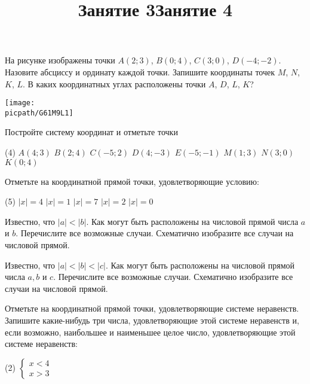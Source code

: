 \begin{class}[number=3-4]
	\title{Занятие 3}
	\begin{listofex}
		\item
		\begin{minipage}[c]{0.6\linewidth}
			На рисунке изображены точки \( A (2;3) \), \( B(0;4) \), \( C(3;0) \), \( D(-4;-2) \). Назовите абсциссу и ординату каждой точки. Запишите координаты точек \( M \), \( N \), \( K \), \( L \). В каких координатных углах расположены точки \( A \), \( D \), \( L \), \( K \)?
		\end{minipage}
		\begin{minipage}[c]{0.4\linewidth}
			\texttt{[image: \\picpath/G61M9L1]}
		\end{minipage}
		\item Постройте систему координат и отметьте точки
		\begin{tasks}(4)
			\task \( A(4;3) \)
			\task \( B(2;4) \)
			\task \( C(-5;2) \)
			\task \( D(4;-3) \)
			\task \( E(-5;-1) \)
			\task \( M(1;3) \)
			\task \( N(3;0) \)
			\task \( K(0;4) \)
		\end{tasks}
		\item Отметьте на координатной прямой точки, удовлетворяющие условию:
		\begin{tasks}(5)
			\task \( |x|=4 \)
			\task \( |x|=1 \)
			\task \( |x|=7 \)
			\task \( |x|=2 \)
			\task \( |x|=0 \)
		\end{tasks}
		\item Известно, что \( |a|<|b| \). Как могут быть расположены на числовой прямой числа \( a \) и \( b \). Перечислите все возможные случаи. Схематично изобразите все случаи на числовой прямой.
		\item Известно, что \( |a|<|b|<|c| \). Как могут быть расположены на числовой прямой числа \(a, b\) и \(c\). Перечислите все возможные случаи. Схематично изобразите все случаи на числовой прямой.
	\end{listofex}
	\title{Занятие 4}
	\begin{listofex}
		\item Отметьте на координатной прямой точки, удовлетворяющие системе неравенств. Запишите какие-нибудь три числа, удовлетворяющие этой системе неравенств и, если возможно, наибольшее и наименьшее целое число, удовлетворяющие этой системе неравенств:
		\begin{tasks}(2)
			\task \( \begin{cases} x<4 \\ x>3 \end{cases} \)

\end{tasks}
\end{listofex}
\end{class}
